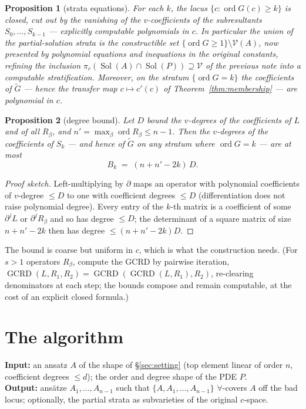\documentclass[11pt]{article}
\newcommand{\Var}{\mathcal{V}}
\DeclareMathOperator{\Sol}{Sol}
\DeclareMathOperator{\GCRD}{GCRD}
\DeclareMathOperator{\ord}{ord}
\newtheorem{proposition}{Proposition}
\begin{document}
\begin{proposition}[strata equations]
\label{prop:strata}
For each $k$, the locus $\{c : \ord G(c) \ge k\}$ is closed, cut out by the
vanishing of the $v$-coefficients of the subresultants
$S_0, \dots, S_{k-1}$ --- explicitly computable polynomials in $c$. In
particular the union of the partial-solution strata is the constructible set
$\{\ord G \ge 1\} \setminus \Var(A)$, now presented by polynomial equations
and inequations in the \emph{original} constants, refining the inclusion
$\pi_c(\Sol(A) \cap \Sol(P)) \supseteq \Var$ of the previous note into a
computable stratification. Moreover, on the stratum $\{\ord G = k\}$ the
coefficients of $\widetilde{G}$ --- hence the transfer map
$c \mapsto c'(c)$ of Theorem~\ref{thm:membership} --- are polynomial in $c$.
\end{proposition}

\begin{proposition}[degree bound]
\label{prop:bound}
Let $D$ bound the $v$-degrees of the coefficients of $L$ and of all
$R_\beta$, and $n' = \max_\beta \ord R_\beta \le n-1$. Then the
$v$-degrees of the coefficients of $S_k$ --- and hence of
$\widetilde{G}$ on any stratum where $\ord G = k$ --- are at most
\[
B_k \;=\; (n + n' - 2k)\, D .
\]
\end{proposition}

\begin{proof}[Proof sketch]
Left-multiplying by $\partial$ maps an operator with polynomial coefficients
of $v$-degree $\le D$ to one with coefficient degrees $\le D$
(differentiation does not raise polynomial degree). Every entry of the
$k$-th matrix is a coefficient of some $\partial^j L$ or $\partial^j R_\beta$
and so has degree $\le D$; the determinant of a square matrix of size
$n + n' - 2k$ then has degree $\le (n + n' - 2k) D$.
\end{proof}

The bound is coarse but uniform in $c$, which is what the construction
needs. (For $s > 1$ operators $R_\beta$, compute the GCRD by pairwise
iteration, $\GCRD(L, R_1, R_2) = \GCRD(\GCRD(L, R_1), R_2)$, re-clearing
denominators at each step; the bounds compose and remain computable, at the
cost of an explicit closed formula.)

\section{The algorithm}
\label{sec:algorithm}

\noindent\textbf{Input:} an ansatz $A$ of the shape of \S\ref{sec:setting}
(top element linear of order $n$, coefficient degrees $\le d$); the order and
degree shape of the PDE $P$.\\
\textbf{Output:} ans\"atze $A_1, \dots, A_{n-1}$ such that
$\{A, A_1, \dots, A_{n-1}\}$ $\forall$-covers $A$ off the bad locus;
optionally, the partial strata as subvarieties of the original $c$-space.
\end{document}

